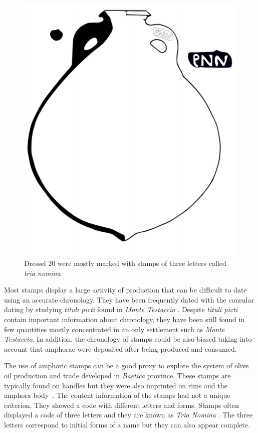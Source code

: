 \begin{figure}[htp]
	\centering
\includegraphics[scale=0.5]{dressel20}
\caption{Dressel 20 were mostly marked with stamps of three letters called \textit{tria nomina}}
\label{amphora}
\end{figure} 

Most stamps display a large activity of production that can be difficult to date using an accurate chronology. They have been frequently dated with the consular dating by studying \textit{tituli picti} found in \textit{Monte Testaccio} \citep{Testaccio1, berni_millet_epigrafianforica_2008}.
Despite \textit{tituli picti} contain important information about chronology, they have been still found in few quantities mostly concentrated in an only settlement such as \textit{Monte Testaccio}. In addition, the chronology of stamps could be also biased taking into account that amphorae were deposited after being produced and consumed.

The use of amphoric stamps can be a good proxy to explore the system of olive oil production and trade developed in \textit{Baetica} province. These stamps are typically found on handles but they were also imprinted on rims and the amphora body~\citep{millet_anforas_1998}. The content information of the stamps had not a unique criterion. They showed a code with different letters and forms. Stamps often displayed a code of three letters and they are known as \textit{Tria Nomina} \citep{berni_millet_amphora_1996}. The three letters correspond to initial forms of a name but they can also appear complete. 

